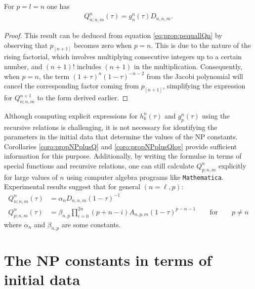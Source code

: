 \begin{corollary}\label{coro:propNPplusQlog}
  For $p=l=n$ one has
  \begin{align}\label{eq:ind_Qpequall_pequaln}
    Q^{n}_{n;n,m}(\tau) =g^n_n(\tau)D_{n,n,m}.
  \end{align}
\end{corollary}
\begin{proof}
  This result can be deduced from equation \eqref{eq:prop:pequallQn} by observing that $p_{[n+1]}$ becomes zero when $p=n$. This is due to the nature of the rising factorial, which involves multiplying consecutive integers up to a certain number, and $(n+1)!$ includes $(n+1)$ in the multiplication. Consequently, when $p=n$, the term $(1+\tau)^{n}(1-\tau)^{-n-2}$ from the Jacobi polynomial will cancel the corresponding factor coming from $p_{[n+1]}$, simplifying the expression for $Q^{n+1}_{n;n,m}$ to the form derived earlier.
\end{proof}


\begin{remark}\label{Remark:Qngen}
  Although computing explicit expressions for $h_{k}^{n}(\tau)$ and $g^{n}_{p}(\tau)$ using the recursive relations is challenging, it is not necessary for identifying the parameters in the initial data that determine the values of the NP constants. Corollaries \ref{coro:propNPplusQ} and \ref{coro:propNPplusQlog} provide sufficient information for this purpose. Additionally, by writing the formulae in terms of special functions and recursive relations, one can still calculate $Q^{n}_{p;n,m}$ explicitly for large values of $n$ using computer algebra programs like {\tt{Mathematica}}. Experimental results suggest that for general $(n=\ell,p)$:
  \begin{subequations}\label{rem:n}
    \begin{align}
      Q^{n}_{n;n,m}(\tau) &=\alpha_{n}D_{n,n,m}(1-\tau)^{-1} \\
      Q^{n}_{p;n,m}(\tau) &=\beta_{n,p}\prod_{i=0}^{2n} (p+n-i)A_{n,p,m}(1-\tau)^{p-n-1} \qquad \text{for}\qquad p\neq n
    \end{align}
    \end{subequations}
    where $\alpha_{n}$ and $\beta_{n,p}$ are some constants.  
\end{remark}
\section{The NP constants in terms of initial data}
\label{sec:NPconstantsInitialData}


